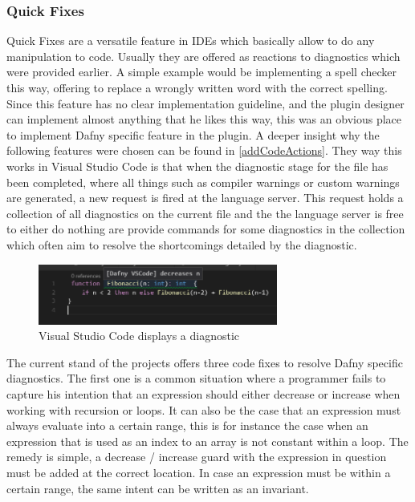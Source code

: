 \subsubsection{Quick Fixes} \label{quickfixes}
Quick Fixes are a versatile feature in IDEs which basically allow to do any manipulation to code. Usually they are offered as reactions to diagnostics which were provided earlier. A simple example would be implementing a spell checker this way, offering to replace a wrongly written word with the correct spelling. \newline
Since this feature has no clear implementation guideline, and the plugin designer can implement almost anything that he likes this way, this was an obvious place to implement Dafny specific feature in the plugin. A deeper insight why the following features were chosen can be found in \ref{addCodeActions}. \newline
They way this works in Visual Studio Code is that when the diagnostic stage for the file has been completed, where all things such as compiler warnings or custom warnings are generated, a new request is fired at the language server. This request holds a collection of all diagnostics on the current file and the the language server is free to either do nothing are provide commands for some diagnostics in the collection which often aim to resolve the shortcomings detailed by the diagnostic. \newline
\begin{figure}[H]
	\centering
	\includegraphics[width=0.7\textwidth]{img/diagnostic}
	\caption{Visual Studio Code displays a diagnostic}
	\label{fig:diagnostic}
\end{figure}
The current stand of the projects offers three code fixes to resolve Dafny specific diagnostics. \newline
The first one is a common situation where a programmer fails to capture his intention that an expression should either decrease or increase when working with recursion or loops. It can also be the case that an expression must always evaluate into a certain range, this is for instance the case when an expression that is used as an index to an array is not constant within a loop. The remedy is simple, a decrease / increase guard with the expression in question must be added at the correct location. In case an expression must be within a certain range, the same intent can be written as an invariant. \newline
